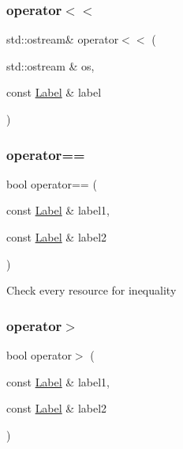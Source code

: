 \mbox{\label{classlabelling_1_1Label_ae52256a096ed1acaf1afaba6458b42ca}} 
\subsubsection{\texorpdfstring{operator$<$$<$}{operator<<}}
{\footnotesize\ttfamily std\+::ostream\& operator$<$$<$ (\begin{DoxyParamCaption}\item[{std\+::ostream \&}]{os,  }\item[{const \hyperlink{classlabelling_1_1Label}{Label} \&}]{label }\end{DoxyParamCaption})\hspace{0.3cm}{\ttfamily [friend]}}

\mbox{\label{classlabelling_1_1Label_abc60b45b5a5310043283c0e6c694cc92}} 
\subsubsection{\texorpdfstring{operator==}{operator==}}
{\footnotesize\ttfamily bool operator== (\begin{DoxyParamCaption}\item[{const \hyperlink{classlabelling_1_1Label}{Label} \&}]{label1,  }\item[{const \hyperlink{classlabelling_1_1Label}{Label} \&}]{label2 }\end{DoxyParamCaption})\hspace{0.3cm}{\ttfamily [friend]}}

Check every resource for inequality \mbox{\label{classlabelling_1_1Label_a7bd46e6920cac7ede4b725f2d33fb12b}} 
\subsubsection{\texorpdfstring{operator$>$}{operator>}}
{\footnotesize\ttfamily bool operator$>$ (\begin{DoxyParamCaption}\item[{const \hyperlink{classlabelling_1_1Label}{Label} \&}]{label1,  }\item[{const \hyperlink{classlabelling_1_1Label}{Label} \&}]{label2 }\end{DoxyParamCaption})\hspace{0.3cm}{\ttfamily [friend]}}



